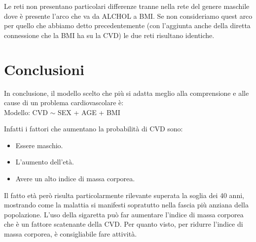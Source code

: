 \documentclass{article}\usepackage[]{graphicx}\usepackage[]{xcolor}
\begin{document}
    Le reti non presentano particolari differenze tranne nella rete del genere 
    maschile dove è presente l'arco che va da ALCHOL a BMI. Se non consideriamo 
    quest arco per quello che abbiamo detto precedentemente (con l'aggiunta
    anche della diretta connessione che la BMI ha su la CVD) le due reti risultano
    identiche.
      
\clearpage


\section{Conclusioni}
  In conclusione, il modello scelto che più si adatta meglio alla comprensione
  e alle cause di un problema cardiovascolare è:\\
  Modello: CVD $\sim$ SEX + AGE + BMI \par
  Infatti i fattori che aumentano la probabilità di CVD sono:
  \begin{itemize}
    \item Essere maschio.
    \item L'aumento dell'età.
    \item Avere un alto indice di massa corporea.
  \end{itemize}
  Il fatto età però risulta particolarmente rilevante superata la soglia dei 40
  anni, mostrando come la malattia si manifesti sopratutto nella fascia
  più anziana della popolazione. L'uso della sigaretta può far aumentare 
  l'indice di massa corporea che è un fattore scatenante della CVD. Per quanto
  visto, per ridurre l'indice di massa corporea, è consigliabile fare attività.
  
\end{document}
